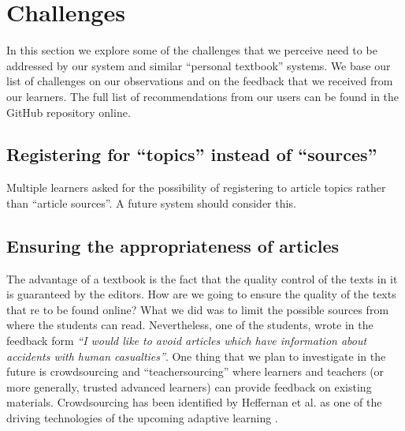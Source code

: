 \newpage
\section{Challenges}
\label{sec:challenges}

In this section we explore some of the challenges that we perceive need to be addressed by our system and similar ``personal textbook'' systems. We base our list of challenges on our observations and on the feedback that we received from our learners. The full list of recommendations from our users can be found in the GitHub repository online.

\subsection{Registering for ``topics'' instead of ``sources''}
Multiple learners asked for the possibility of registering to article topics rather than ``article sources''. A future system should consider this.

\subsection{Ensuring the appropriateness of articles}
The advantage of a textbook is the fact that the quality control of the texts in it is guaranteed by the editors. How are we going to ensure the quality of the texts that re to be found online? What we did was to limit the possible sources from where the students can read. Nevertheless, one of the students, wrote in the feedback form {\em ``I would like to avoid articles which have information about accidents with human casualties''}. One thing that we plan to investigate in the future is crowdsourcing and ``teachersourcing'' where learners and teachers (or more generally, trusted advanced learners) can provide feedback on existing materials. Crowdsourcing has been identified by Heffernan et al. as one of the driving technologies of the upcoming adaptive learning \cite{Heff16-crowdsourcing}. 




